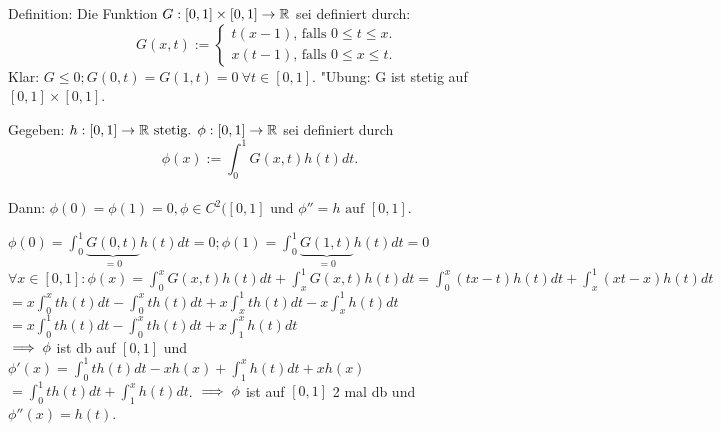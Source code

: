 \documentclass{article}
\begin{document}
Definition: Die Funktion $G:[0,1]\times[0,1]\to\mathbb{R}$ sei definiert durch: 
\[ \quad
G(x,t):=
\begin{cases}
t(x-1)\text{, falls } 0\le t\le x\text{.}\\
x(t-1)\text{, falls } 0\le x\le t\text{.}
\end{cases} \]
Klar: $G\le0; G(0,t)=G(1,t)=0\ \forall t\in[0,1]$.
"Ubung: G ist stetig auf $[0,1]\times[0,1]$.

\begin{wichtigerhilfssatz}
Gegeben: $h:[0,1]\to\mathbb{R} \text{ stetig. } \phi:[0,1]\to\mathbb{R}$ sei definiert durch 
$$ \phi(x) := \int_0^1G(x,t)h(t)dt\text{.}$$ \\
Dann: $ \phi(0)=\phi(1)=0, \phi\in C^2([0,1]$ und $\phi''=h\text{ auf }[0,1]$.\\
\end{wichtigerhilfssatz}
\begin{beweis}
$\phi(0) = \int_0^1\underbrace{G(0,t)}_{=0}h(t)dt = 0;\phi(1)=\int_0^1\underbrace{G(1,t)}_{=0}h(t)dt=0$\\
$\forall x\in[0,1]: \phi(x)=\int_0^xG(x,t)h(t)dt+\int_x^1G(x,t)h(t)dt=\int_0^x(tx-t)h(t)dt+\int_x^1(xt-x)h(t)dt$\\
$=x\int_0^x th(t)dt-\int_0^x th(t)dt+x\int_x^1 th(t)dt-x\int_x^1 h(t)dt$\\
$=x\int_0^1 th(t)dt-\int_0^xth(t)dt+x\int_1^xh(t)dt$\\
$\implies \phi$ ist db auf $[0,1]$ und $\phi'(x)=\int_0^1th(t)dt-xh(x)+\int_1^xh(t)dt+xh(x)$\\
$=\int_0^1th(t)dt+\int_1^xh(t)dt$.
$\implies \phi$ ist auf $[0,1]$ 2 mal db und $\phi''(x) =h(t)$.
\end{beweis}
\end{document}
